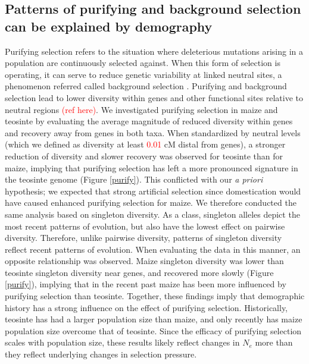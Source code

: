 \documentclass{pnastwo}
\begin{document}
\begin{article}
\subsection{Patterns of purifying and background selection can be explained by demography}
Purifying selection refers to the situation where deleterious
mutations arising in a population are continuously selected against. When this
form of selection is operating, it can serve to reduce genetic
variability at linked neutral sites, a phenomenon referred called
background selection \cite{charlesworth1993}. Purifying and background selection lead
to lower diversity within genes and other functional sites relative
to neutral regions \textcolor{red}{(ref here)}. We investigated purifying
selection in maize and teosinte by evaluating the average magnitude of reduced
diversity within genes and recovery away from genes in both taxa. When standardized by neutral
levels (which we defined as diversity at least \textcolor{red}{0.01} cM distal
from genes), a stronger reduction of diversity
and slower recovery was observed for teosinte than for maize, implying
that purifying selection has left a more pronounced signature in the
teosinte genome (Figure \ref{purify}). This conflicted with our \emph{a priori} hypothesis;
we expected that strong artificial selection since domestication would
have caused enhanced purifying selection for maize. We therefore
conducted the same analysis based on singleton diversity. As a class,
singleton alleles depict the most recent patterns of evolution, but
also have the lowest effect on pairwise diversity. Therefore, unlike
pairwise diversity, patterns of singleton
diversity reflect recent patterns of evolution. When
evaluating the data in this manner, an opposite relationship was
observed. Maize singleton diversity was lower than teosinte singleton
diversity near genes, and recovered more slowly
(Figure \ref{purify}), implying that in the
recent past maize has been more influenced by purifying selection than
teosinte. Together, these findings imply that demographic history has
a strong influence on the effect of purifying selection. Historically,
teosinte has had a larger population size than maize, and only
recently has maize population size overcome that of teosinte. Since
the efficacy of purifying selection scales with population size,
these results likely reflect changes in $N_e$ more than they reflect
underlying changes in selection pressure.



\end{article}
\end{document}
